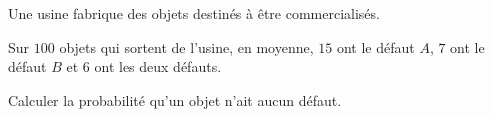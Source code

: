 \begin{exo}
	Une usine fabrique des objets destinés à être commercialisés.

	Sur $100$ objets qui sortent de l'usine, en moyenne, $15$ ont le défaut $A$, $7$ ont le défaut $B$ et $6$ ont les deux défauts.

	Calculer la probabilité qu'un objet n'ait aucun défaut.
\end{exo}
